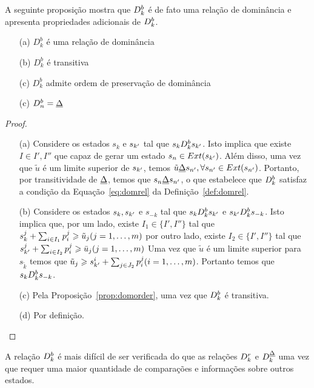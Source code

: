A seguinte proposição mostra que $D_k^{b}$ é de fato uma relação de dominância
e apresenta propriedades adicionais de $D_k^{b}$.
\begin{myprop}[Relação $D_k^b$]
  \noindent
  \begin{enumerate}
    \item[(a)] $D_k^b$ é uma relação de dominância
    \item[(b)] $D_k^b$ é transitiva
    \item[(c)] $D_k^b$ admite ordem de preservação de dominância
    \item[(c)] $D_n^b = \underline{\Delta}$
\end{enumerate}
\end{myprop}

\begin{proof}
  \noindent
  \begin{enumerate}
    \item[(a)]{ Considere os estados $s_k$ e $s_{{k'}}$ tal que $s_k D_k^{b} s_{{k'}}$.
      Isto implica que existe $I \in {I', I''}$ que capaz de gerar um estado $s_n \in Ext(s_{{k'}})$.
      Além disso, uma vez que $\tilde{u}$ é um limite superior de $s_{{k'}}$,
      temos $\tilde{u} \underline{\Delta} s_{{n'}}, \forall s_{{n'}} \in Ext(s_{{n'}})$.
      Portanto, por transitividade de $\underline{\Delta}$, temos que $s_n \underline{\Delta} s_{{n'}}$,
      o que estabelece que $D_k^{b}$ satisfaz a condição da Equação~\ref{eq:domrel}
      da Definição~\ref{def:domrel}.
      }
    \item[(b)]{ Considere os estados $s_k, s_{{k'}}$ e $s_{-k}$ tal que
      $s_k D_k^{b} s_{{k'}}$ e $s_{{k'}} D_k^{b} s_{-k}$.
      Isto implica que, por um lado, existe $I_1 \in \{I', I''\}$ tal que
      $s_k^j + \sum_{i \in I_1} p^j_i \geqslant \tilde{u}_j (j = 1, \ldots, m)$
      por outro lado, existe $I_2 \in \{I', I''\}$ tal que
      $s_{{k'}}^j + \sum_{i \in I_2} p^j_i \geqslant \bar{u}_j (j = 1, \ldots, m)$
      Uma vez que $\tilde{u}$ é um limite superior para $s_{\tilde{k}}$ temos que
      $\tilde{u}_j \geqslant s_{{k'}}^i + \sum_{j \in J_2} p^j_i (i = 1, \ldots, m)$.
      Portanto temos que $s_k D_k^{b} s_{-k}$. }
    \item[(c)]{Pela Proposição~\ref{prop:domorder}, uma vez que $D_k^{b}$ é transitiva.}
    \item[(d)]{Por definição.} \qedhere
  \end{enumerate}
\end{proof}
A relação $D_k^{b}$ é mais difícil de ser verificada do que as relações
$D_k^r$ e $D_k^{\underline{\Delta}}$ uma vez que requer uma maior quantidade de
comparações e informações sobre outros estados.

